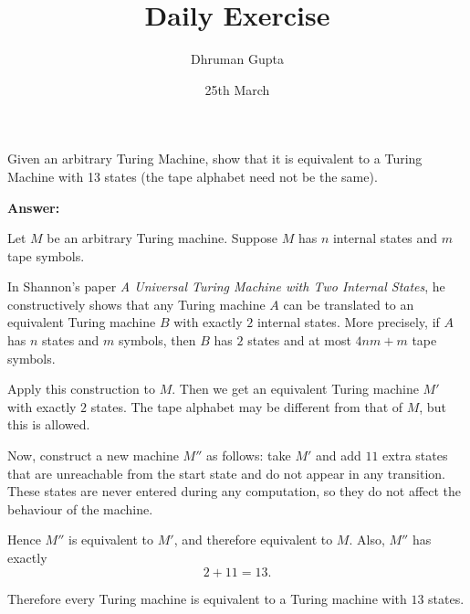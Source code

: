 \documentclass[11pt]{article}
\title{Daily Exercise}
\author{Dhruman Gupta}
\date{25th March}
\begin{document}

Given an arbitrary Turing Machine, show that it is equivalent to a Turing Machine with 13 states (the tape alphabet need not be the same).

\textbf{Answer:}

Let $M$ be an arbitrary Turing machine. Suppose $M$ has $n$ internal states and $m$ tape symbols.

In Shannon's paper \emph{A Universal Turing Machine with Two Internal States}, he constructively shows that any Turing machine $A$ can be translated to an equivalent Turing machine $B$ with exactly $2$ internal states. More precisely, if $A$ has $n$ states and $m$ symbols, then $B$ has $2$ states and at most $4nm + m$ tape symbols.

Apply this construction to $M$. Then we get an equivalent Turing machine $M'$ with exactly $2$ states. The tape alphabet may be different from that of $M$, but this is allowed.

Now, construct a new machine $M''$ as follows: take $M'$ and add $11$ extra states that are unreachable from the start state and do not appear in any transition. These states are never entered during any computation, so they do not affect the behaviour of the machine.

Hence $M''$ is equivalent to $M'$, and therefore equivalent to $M$. Also, $M''$ has exactly
\[
2 + 11 = 13.
\]

Therefore every Turing machine is equivalent to a Turing machine with $13$ states.
\end{document}
